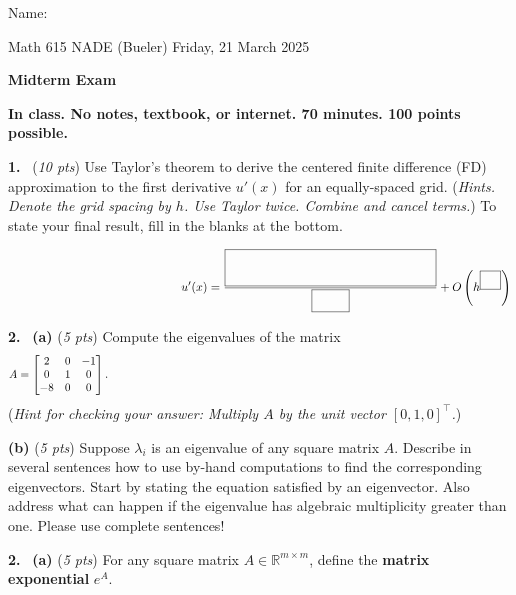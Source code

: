 \documentclass[11pt]{amsart}
\newcommand{\RR}{{\mathbb{R}}}
\newcommand{\prob}[1]{\bigskip\noindent \textbf{#1.}~}
\newcommand{\pts}[1]{(\emph{#1 pts})}
\newcommand{\probpts}[2]{\prob{#1} \pts{#2} \quad}
\newcommand{\ppartpts}[2]{\textbf{(#1)} \pts{#2} \quad}
\newcommand{\epartpts}[2]{\medskip\noindent \textbf{(#1)} \pts{#2} \quad}
\begin{document}
\hfill \Large Name:\underline{\phantom{really really really long long long name}}
\medskip

\scriptsize \noindent Math 615 NADE (Bueler) \hfill Friday, 21 March 2025
\medskip

\Large\centerline{\textbf{Midterm Exam}}

\smallskip
\large
\begin{center}
\textbf{In class.  No notes, textbook, or internet.  70 minutes.  100 points possible.}
\end{center}

\medskip

\thispagestyle{empty}

\normalsize
\probpts{1}{10}   Use Taylor's theorem to derive the centered finite difference (FD) approximation to the first derivative $u'(x)$ for an equally-spaced grid.  (\emph{Hints.  Denote the grid spacing by $h$.  Use Taylor twice.  Combine and cancel terms.})  To state your final result, fill in the blanks at the bottom.
\vfill

{\large
$$\hspace{2.0in} u'(x) = \frac{\boxed{\begin{matrix}  \phantom{sdkljfa sdakfl asdfklj asdf asdlfkj asdf} \\ \phantom{kjads} \end{matrix}}}{\boxed{\strut\phantom{ksdjf}}} + O\left(h^{\boxed{\phantom{jf}}}\right)$$
}
\bigskip


\newpage
\prob{2}  \ppartpts{a}{5}  Compute the eigenvalues of the matrix
    $$A = \begin{bmatrix}
    2 & 0 & -1 \\
    0 & 1 & 0 \\
    -8 & 0 & 0 
    \end{bmatrix}. \hspace{5.0in}$$
(\emph{Hint for checking your answer: Multiply $A$ by the unit vector $[0,1,0]^\top$.})
\vfill

\epartpts{b}{5}   Suppose $\lambda_i$ is an eigenvalue of any square matrix $A$.  Describe in several sentences how to use by-hand computations to find the corresponding eigenvectors.  Start by stating the equation satisfied by an eigenvector.  Also address what can happen if the eigenvalue has algebraic multiplicity greater than one.  Please use complete sentences!
\vfill


\newpage
\prob{2} \ppartpts{a}{5}  For any square matrix $A\in\RR^{m\times m}$, define the \textbf{matrix exponential} $e^A$.
\vspace{2.0in}
\end{document}
